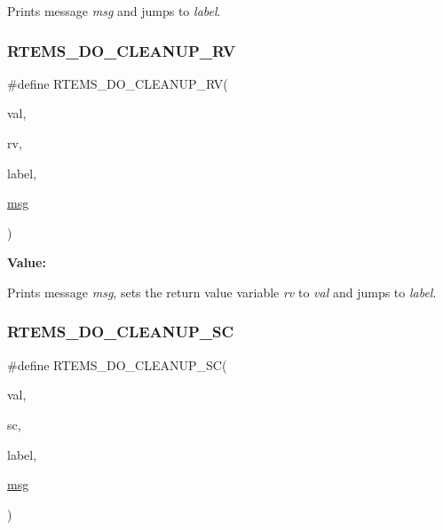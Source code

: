 Prints message {\itshape msg} and jumps to {\itshape label}. 

\mbox{\label{group__rtems__status__checks_ga73faf2a5b5c46ff8e3e061baec934002}} 
\subsubsection{\texorpdfstring{RTEMS\_DO\_CLEANUP\_RV}{RTEMS\_DO\_CLEANUP\_RV}}
{\footnotesize\ttfamily \#define R\+T\+E\+M\+S\+\_\+\+D\+O\+\_\+\+C\+L\+E\+A\+N\+U\+P\+\_\+\+RV(\begin{DoxyParamCaption}\item[{}]{val,  }\item[{}]{rv,  }\item[{}]{label,  }\item[{}]{\mbox{\hyperlink{structmsg}{msg}} }\end{DoxyParamCaption})}

{\bfseries Value\+:}
\begin{DoxyCode}{0}
\DoxyCodeLine{\textcolor{keywordflow}{do} \{ \(\backslash\)}

\end{DoxyCode}


Prints message {\itshape msg}, sets the return value variable {\itshape rv} to {\itshape val} and jumps to {\itshape label}. 

\mbox{\label{group__rtems__status__checks_ga5f74dc2ba6b31bc376dcfd33386ebf47}} 
\subsubsection{\texorpdfstring{RTEMS\_DO\_CLEANUP\_SC}{RTEMS\_DO\_CLEANUP\_SC}}
{\footnotesize\ttfamily \#define R\+T\+E\+M\+S\+\_\+\+D\+O\+\_\+\+C\+L\+E\+A\+N\+U\+P\+\_\+\+SC(\begin{DoxyParamCaption}\item[{}]{val,  }\item[{}]{sc,  }\item[{}]{label,  }\item[{}]{\mbox{\hyperlink{structmsg}{msg}} }\end{DoxyParamCaption})}

